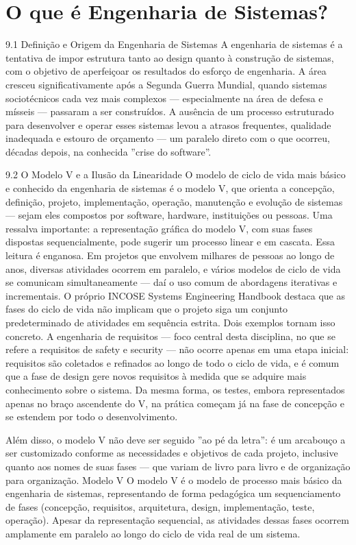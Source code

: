 \chapter{O que é Engenharia de Sistemas?}

9.1 Definição e Origem da Engenharia de Sistemas A engenharia de sistemas é a tentativa de impor estrutura tanto ao design quanto à construção de sistemas, com o objetivo de aperfeiçoar os resultados do esforço de engenharia. A área cresceu significativamente após a Segunda Guerra Mundial, quando sistemas sociotécnicos cada vez mais complexos — especialmente na área de defesa e mísseis — passaram a ser construídos. A ausência de um processo estruturado para desenvolver e operar esses sistemas levou a atrasos frequentes, qualidade inadequada e estouro de orçamento — um paralelo direto com o que ocorreu, décadas depois, na conhecida ”crise do software”.

9.2 O Modelo V e a Ilusão da Linearidade O modelo de ciclo de vida mais básico e conhecido da engenharia de sistemas é o modelo V, que orienta a concepção, definição, projeto, implementação, operação, manutenção e evolução de sistemas — sejam eles compostos por software, hardware, instituições ou pessoas. Uma ressalva importante: a representação gráfica do modelo V, com suas fases dispostas sequencialmente, pode sugerir um processo linear e em cascata. Essa leitura é enganosa. Em projetos que envolvem milhares de pessoas ao longo de anos, diversas atividades ocorrem em paralelo, e vários modelos de ciclo de vida se comunicam simultaneamente — daí o uso comum de abordagens iterativas e incrementais. O próprio INCOSE Systems Engineering Handbook destaca que as fases do ciclo de vida não implicam que o projeto siga um conjunto predeterminado de atividades em sequência estrita. Dois exemplos tornam isso concreto. A engenharia de requisitos — foco central desta disciplina, no que se refere a requisitos de safety e security — não ocorre apenas em uma etapa inicial: requisitos são coletados e refinados ao longo de todo o ciclo de vida, e é comum que a fase de design gere novos requisitos à medida que se adquire mais conhecimento sobre o sistema. Da mesma forma, os testes, embora representados apenas no braço ascendente do V, na prática começam já na fase de concepção e se estendem por todo o desenvolvimento.

Além disso, o modelo V não deve ser seguido ”ao pé da letra”: é um arcabouço a ser customizado conforme as necessidades e objetivos de cada projeto, inclusive quanto aos nomes de suas fases — que variam de livro para livro e de organização para organização. Modelo V O modelo V é o modelo de processo mais básico da engenharia de sistemas, representando de forma pedagógica um sequenciamento de fases (concepção, requisitos, arquitetura, design, implementação, teste, operação). Apesar da representação sequencial, as atividades dessas fases ocorrem amplamente em paralelo ao longo do ciclo de vida real de um sistema.

